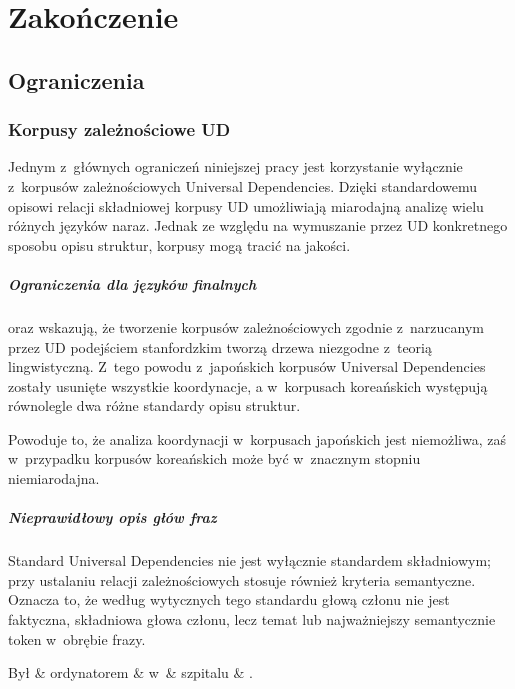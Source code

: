 \chapter{Zakończenie} \label{ch7}

\section{Ograniczenia}

\subsection{Korpusy zależnościowe UD}

Jednym z~głównych ograniczeń niniejszej pracy jest korzystanie wyłącznie z~korpusów zależnościowych Universal Dependencies. Dzięki standardowemu opisowi relacji składniowej korpusy UD umożliwiają miarodajną analizę wielu różnych języków naraz. Jednak ze względu na wymuszanie przez UD konkretnego sposobu opisu struktur, korpusy mogą tracić na jakości.

\paragraph{Ograniczenia dla języków finalnych}
\cite{choi2011statistical} oraz \cite{kanayama2018coordinate} wskazują, że tworzenie korpusów zależnościowych zgodnie z~narzucanym przez UD podejściem stanfordzkim tworzą drzewa niezgodne z~teorią lingwistyczną. Z~tego powodu z~japońskich korpusów Universal Dependencies zostały usunięte wszystkie koordynacje, a w~korpusach koreańskich występują równolegle dwa różne standardy opisu struktur.

Powoduje to, że analiza koordynacji w~korpusach japońskich jest niemożliwa, zaś w~przypadku korpusów koreańskich może być w~znacznym stopniu niemiarodajna.

\paragraph{Nieprawidłowy opis głów fraz}
Standard Universal Dependencies nie jest wyłącznie standardem składniowym; przy ustalaniu relacji zależnościowych stosuje również kryteria semantyczne. Oznacza to, że według wytycznych tego standardu głową członu nie jest faktyczna, składniowa głowa członu, lecz temat lub najważniejszy semantycznie token w~obrębie frazy. 

\begin{exe} 
\ex
\begin{dependency}[baseline=-\the\dimexpr\fontdimen22\textfont2\relax]
\begin{deptext}[column sep=1em]
Był \& ordynatorem \& w~\& szpitalu \& .  \\ 
\end{deptext}
\end{dependency}
\label{UD-złe}
\end{exe}

